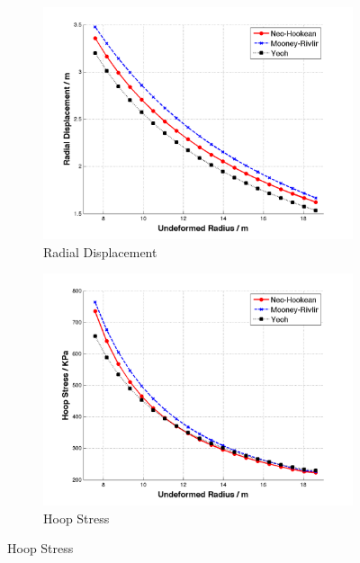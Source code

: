 \begin{figure}[H]
	\begin{subfigure}[b]{0.5\textwidth}
		\centering
		\includegraphics[width=\textwidth]{./figures/ur_models.png}
		\caption{Radial Displacement}
		\label{ur_models}
	\end{subfigure}
	\begin{subfigure}[b]{0.5\textwidth}
		\centering
		\includegraphics[width=\textwidth]{./figures/hoop_models.png}
		\caption{Hoop Stress}
		\label{hoop_models}
	\end{subfigure}
	

\end{figure}
